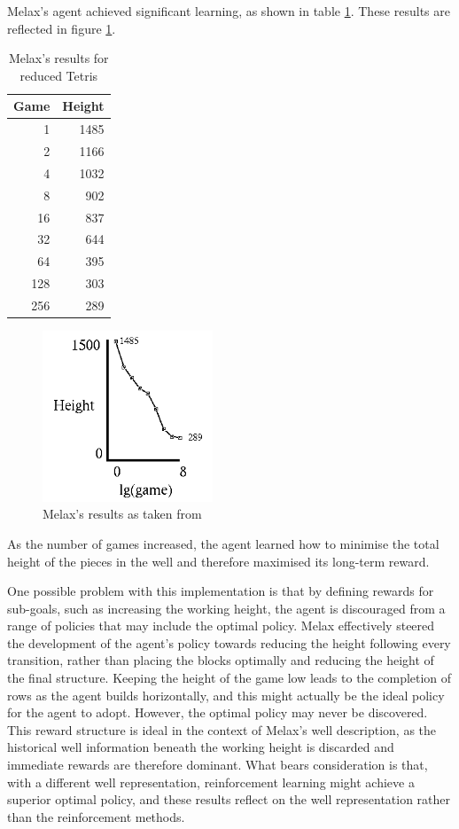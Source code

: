 \documentclass{rucsthesis}
\begin{document}
Melax's agent achieved significant learning, as shown in table \ref{mresults}. These results are reflected in figure \ref{fig:meres}.

\begin{table}[h]
\centering
\begin{tabular}{|r|r|}
\hline
Game & Height  \\
\hline
    1 &  1485 \\
     2  & 1166 \\
     4  & 1032 \\
     8  &  902 \\
    16  &  837 \\
    32  &  644 \\
    64  &  395 \\
   128  &  303 \\
   256   & 289 \\
\hline
\end{tabular}
\caption{Melax's results for reduced Tetris}
\label{mresults}
\end{table}

\begin{figure}[h]
\centering
\includegraphics[width=2in]{melaxresults.png}
\caption{Melax's results as taken from \cite{melaxtetris}}
\label{fig:meres}
\end{figure}

As the number of games increased, the agent learned how to minimise the total height of the pieces in the well and therefore maximised its long-term reward.

One possible problem with this implementation is that by defining rewards for sub-goals, such as increasing the working height, the agent is discouraged from a range of policies that may include the optimal policy.  Melax effectively steered the development of the agent's policy towards reducing the height following every transition, rather than placing the blocks optimally and reducing the height of the final structure. Keeping the height of the game low leads to the completion of rows as the agent builds horizontally, and this might actually be the ideal policy for the agent to adopt. However, the optimal policy may never be discovered. This reward structure is ideal in the context of Melax's well description, as the historical well information beneath the working height is discarded and immediate rewards are therefore dominant. What bears consideration is that, with a different well representation, reinforcement learning might achieve a superior optimal policy, and these results reflect on the well representation rather than the reinforcement methods.
\end{document}
